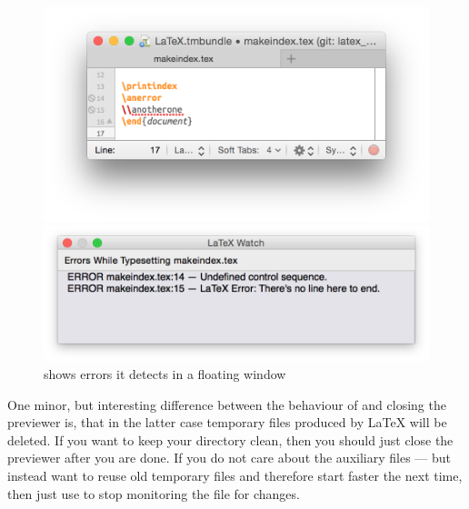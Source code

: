 \documentclass[11pt, x11names]{article}
\begin{document}
\begin{figure}[htbp]
  \begin{minipage}[t]{0.5\textwidth}
    \vspace{0cm}
    \centering
      \includegraphics[width=\textwidth]{Figures/LaTeX Watch - TextMate.png}
  \end{minipage}
  \begin{minipage}[t]{0.5\textwidth}
    \vspace{0.5cm}
    \centering
      \includegraphics[width=\textwidth]{Figures/LaTeX Watch - Notification Window.png}
  \end{minipage}

  \caption{ shows errors it detects in a floating window}
  \label{fig:LaTeX_Watch}
\end{figure}

One minor, but interesting difference between the behaviour of  and closing the previewer is, that in the latter case temporary files produced by LaTeX will be deleted. If you want to keep your directory clean, then you should just close the previewer after you are done. If you do not care about the auxiliary files — but instead want  to reuse old temporary files and therefore start faster the next time, then just use  to stop monitoring the file for changes.
\end{document}
